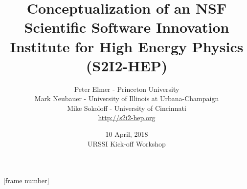 \documentclass{beamer}
\title{Conceptualization of an NSF Scientific Software Innovation Institute for High Energy Physics (S2I2-HEP)}
\author{Peter Elmer - Princeton University \\
        Mark Neubauer - University of Illinois at Urbana-Champaign \\
        Mike Sokoloff - University of Cincinnati \\  
        \url{http://s2i2-hep.org}}
\date{10 April, 2018 \\ URSSI Kick-off Workshop}
\begin{document}
\maketitle

%
%

[frame number]







%
%





%






\end{document}
